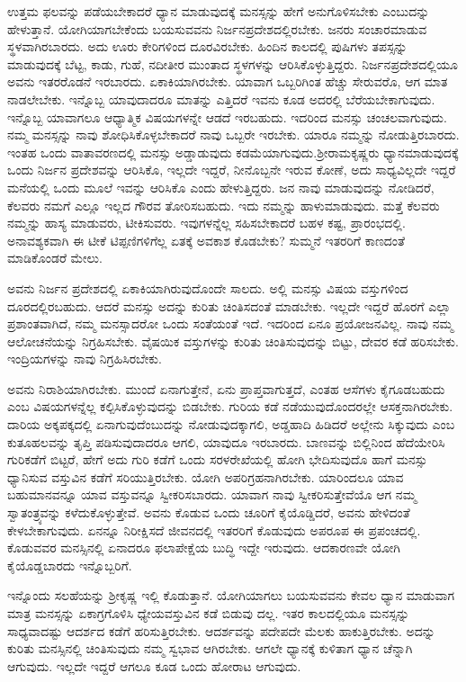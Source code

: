 ಉತ್ತಮ ಫಲವನ್ನು ಪಡೆಯಬೇಕಾದರೆ ಧ್ಯಾನ ಮಾಡುವುದಕ್ಕೆ ಮನಸ್ಸನ್ನು ಹೇಗೆ ಅನುಗೊಳಿಸಬೇಕು ಎಂಬುದನ್ನು ಹೇಳುತ್ತಾನೆ. ಯೋಗಿಯಾಗಬೇಕೆಂದು ಬಯಸುವವನು ನಿರ್ಜನಪ್ರದೇಶ\-ದಲ್ಲಿರಬೇಕು. ಜನರು ಸಂಚಾರಮಾಡುವ ಸ್ಥಳವಾಗಿರಬಾರದು. ಅದು ಊರು ಕೇರಿಗಳಿಂದ ದೂರವಿರಬೇಕು. ಹಿಂದಿನ ಕಾಲದಲ್ಲಿ ಪುಷಿಗಳು ತಪಸ್ಸನ್ನು ಮಾಡುವುದಕ್ಕೆ ಬೆಟ್ಟ, ಕಾಡು, ಗುಹೆ, ನದೀತೀರ ಮುಂತಾದ ಸ್ಥಳಗಳನ್ನು ಆರಿಸಿಕೊಳ್ಳುತ್ತಿದ್ದರು. ನಿರ್ಜನಪ್ರದೇಶದಲ್ಲಿಯೂ ಅವನು ಇತರರೊಡನೆ ಇರಬಾರದು. ಏಕಾಕಿಯಾಗಿರಬೇಕು. ಯಾವಾಗ ಒಬ್ಬರಿಗಿಂತ ಹೆಚ್ಚು ಸೇರುವರೊ, ಆಗ ಮಾತ ನಾಡಲೇಬೇಕು. ಇನ್ನೊಬ್ಬ ಯಾವುದಾದರೂ ಮಾತನ್ನು ಎತ್ತಿದರೆ ಇವನು ಕೂಡ ಅದರಲ್ಲಿ ಬೆರೆಯಬೇಕಾಗುವುದು. ಇನ್ನೊಬ್ಬ ಯಾವಾಗಲೂ ಆಧ್ಯಾತ್ಮಿಕ ವಿಷಯಗಳನ್ನೇ ಆಡದೆ ಇರಬಹುದು. ಇದರಿಂದ ಮನಸ್ಸು ಚಂಚಲವಾಗುವುದು. ನಮ್ಮ ಮನಸ್ಸನ್ನು ನಾವು ಶೋಧಿಸಿಕೊಳ್ಳಬೇಕಾದರೆ ನಾವು ಒಬ್ಬರೇ ಇರಬೇಕು. ಯಾರೂ ನಮ್ಮನ್ನು ನೋಡುತ್ತಿರಬಾರದು. ಇಂತಹ ಒಂದು ವಾತಾವರಣದಲ್ಲಿ ಮನಸ್ಸು ಅಡ್ಡಾಡುವುದು ಕಡಮೆಯಾಗುವುದು.\break ಶ‍್ರೀರಾಮಕೃಷ್ಣರು ಧ್ಯಾನಮಾಡುವುದಕ್ಕೆ ಒಂದು ನಿರ್ಜನ ಪ್ರದೇಶವನ್ನು ಆರಿಸಿಕೊ, ಇಲ್ಲದೇ ಇದ್ದರೆ, ನೀನೊಬ್ಬನೇ ಇರುವ ಕೋಣೆ, ಅದು ಸಾಧ್ಯವಿಲ್ಲದೇ ಇದ್ದರೆ ಮನೆಯಲ್ಲಿ ಒಂದು ಮೂಲೆ ಇವನ್ನು ಆರಿಸಿಕೊ ಎಂದು ಹೇಳುತ್ತಿದ್ದರು. ಜನ ನಾವು ಮಾಡುವುದನ್ನು ನೋಡಿದರೆ, ಕೆಲವರು ನಮಗೆ ಎಲ್ಲೂ ಇಲ್ಲದ ಗೌರವ ತೋರಿಸಬಹುದು. ಇದು ನಮ್ಮನ್ನು ಹಾಳುಮಾಡುವುದು. ಮತ್ತೆ ಕೆಲವರು ನಮ್ಮನ್ನು ಹಾಸ್ಯ ಮಾಡುವರು, ಟೀಕಿಸುವರು. ಇವುಗಳನ್ನೆಲ್ಲ ಸಹಿಸಬೇಕಾದರೆ ಬಹಳ ಕಷ್ಟ, ಪ್ರಾರಂಭದಲ್ಲಿ. ಅನಾವಶ್ಯಕವಾಗಿ ಈ ಟೀಕೆ ಟಿಪ್ಪಣಿಗಳಿಗೆಲ್ಲ ಏತಕ್ಕೆ ಅವಕಾಶ ಕೊಡಬೇಕು? ಸುಮ್ಮನೆ ಇತರರಿಗೆ ಕಾಣದಂತೆ ಮಾಡಿಕೊಂಡರೆ ಮೇಲು.

ಅವನು ನಿರ್ಜನ ಪ್ರದೇಶದಲ್ಲಿ ಏಕಾಕಿಯಾಗಿರುವುದೊಂದೇ ಸಾಲದು. ಅಲ್ಲಿ ಮನಸ್ಸು ವಿಷಯ ವಸ್ತುಗಳಿಂದ ದೂರದಲ್ಲಿರಬಹುದು. ಆದರೆ ಮನಸ್ಸು ಅದನ್ನು ಕುರಿತು ಚಿಂತಿಸದಂತೆ ಮಾಡಬೇಕು. ಇಲ್ಲದೇ ಇದ್ದರೆ ಹೊರಗೆ ಎಲ್ಲಾ ಪ್ರಶಾಂತವಾಗಿದೆ, ನಮ್ಮ ಮನಸ್ಸಾದರೋ ಒಂದು ಸಂತೆಯಂತೆ ಇದೆ. ಇದರಿಂದ ಏನೂ ಪ್ರಯೋಜನವಿಲ್ಲ. ನಾವು ನಮ್ಮ ಆಲೋಚನೆಯನ್ನು ನಿಗ್ರಹಿಸಬೇಕು. ವೈಷಯಿಕ ವಸ್ತುಗಳನ್ನು ಕುರಿತು ಚಿಂತಿಸುವುದನ್ನು ಬಿಟ್ಟು, ದೇವರ ಕಡೆ ಹರಿಸಬೇಕು. ಇಂದ್ರಿಯಗಳನ್ನು ನಾವು ನಿಗ್ರಹಿಸಿರಬೇಕು.

ಅವನು ನಿರಾಶಿಯಾಗಿರಬೇಕು. ಮುಂದೆ ಏನಾಗುತ್ತೇನೆ, ಏನು ಪ್ರಾಪ್ತವಾಗುತ್ತದೆ, ಎಂತಹ ಆಸೆಗಳು ಕೈಗೂಡಬಹುದು ಎಂಬ ವಿಷಯಗಳನ್ನೆಲ್ಲ ಕಲ್ಪಿಸಿಕೊಳ್ಳುವುದನ್ನು ಬಿಡಬೇಕು. ಗುರಿಯ ಕಡೆ ನಡೆಯುವುದೊಂದರಲ್ಲೇ ಆಸಕ್ತನಾಗಿರಬೇಕು. ದಾರಿಯ ಅಕ್ಕಪಕ್ಕದಲ್ಲಿ ಏನಾಗುವುದೆಂಬು\-ದನ್ನು ನೋಡುವುದಕ್ಕಾಗಲಿ, ಅಡ್ಡಹಾದಿ ಹಿಡಿದರೆ ಅಲ್ಲೇನು ಸಿಕ್ಕುವುದು ಎಂಬ ಕುತೂಹಲವನ್ನು ತೃಪ್ತಿ ಪಡಿಸುವುದಾದರೂ ಆಗಲಿ, ಯಾವುದೂ ಇರಬಾರದು. ಬಾಣವನ್ನು ಬಿಲ್ಲಿನಿಂದ ಹೆದೆಯೇರಿಸಿ ಗುರಿಕಡೆಗೆ ಬಿಟ್ಟರೆ, ಹೇಗೆ ಅದು ಗುರಿ ಕಡೆಗೆ ಒಂದು ಸರಳರೇಖೆಯಲ್ಲಿ ಹೋಗಿ ಭೇದಿಸುವುದೊ ಹಾಗೆ ಮನಸ್ಸು ಧ್ಯಾನಿಸುವ ವಸ್ತುವಿನ ಕಡೆಗೆ ಸರಿಯುತ್ತಿರಬೇಕು. ಯೋಗಿ ಅಪರಿಗ್ರಹನಾಗಿರಬೇಕು. ಯಾರಿಂದಲೂ ಯಾವ ಬಹುಮಾನವನ್ನೂ ಯಾವ ವಸ್ತುವನ್ನೂ ಸ್ವೀಕರಿಸಬಾರದು. ಯಾವಾಗ ನಾವು ಸ್ವೀಕರಿಸುತ್ತೇವೆಯೊ ಆಗ ನಮ್ಮ ಸ್ವಾತಂತ್ರ್ಯವನ್ನು ಕಳೆದುಕೊಳ್ಳುತ್ತೇವೆ. ಅವನು ಕೊಡುವ ಒಂದು ಚೂರಿಗೆ ಕೈಯೊಡ್ಡಿದರೆ, ಅವನು ಹೇಳಿದಂತೆ ಕೇಳಬೇಕಾಗುವುದು. ಏನನ್ನೂ ನಿರೀಕ್ಷಿಸದೆ ಜೀವನದಲ್ಲಿ ಇತರರಿಗೆ ಕೊಡುವುದು ಅಪರೂಪ ಈ ಪ್ರಪಂಚದಲ್ಲಿ. ಕೊಡುವವರ ಮನಸ್ಸಿನಲ್ಲಿ ಏನಾದರೂ ಫಲಾಪೇಕ್ಷೆಯ ಬುದ್ಧಿ ಇದ್ದೇ ಇರುವುದು. ಆದಕಾರಣವೇ ಯೋಗಿ ಕೈಯೊಡ್ಡಬಾರದು ಇನ್ನೊಬ್ಬರಿಗೆ.

ಇನ್ನೊಂದು ಸಲಹೆಯನ್ನು ಶ‍್ರೀಕೃಷ್ಣ ಇಲ್ಲಿ ಕೊಡುತ್ತಾನೆ. ಯೋಗಿಯಾಗಲು ಬಯಸುವವನು ಕೇವಲ ಧ್ಯಾನ ಮಾಡುವಾಗ ಮಾತ್ರ ಮನಸ್ಸನ್ನು ಏಕಾಗ್ರಗೊಳಿಸಿ ಧ್ಯೇಯವಸ್ತುವಿನ ಕಡೆ ಬಿಡುವು ದಲ್ಲ. ಇತರ ಕಾಲದಲ್ಲಿಯೂ ಮನಸ್ಸನ್ನು ಸಾಧ್ಯವಾದಷ್ಟು ಆದರ್ಶದ ಕಡೆಗೆ ಹರಿಸುತ್ತಿರಬೇಕು. ಆದರ್ಶವನ್ನು ಪದೇಪದೇ ಮೆಲಕು ಹಾಕುತ್ತಿರಬೇಕು. ಅದನ್ನು ಕುರಿತು ಮನಸ್ಸಿನಲ್ಲಿ ಚಿಂತಿಸುವುದು ನಮ್ಮ ಸ್ವಭಾವ ಆಗಿರಬೇಕು. ಆಗಲೇ ಧ್ಯಾನಕ್ಕೆ ಕುಳಿತಾಗ ಧ್ಯಾನ ಚೆನ್ನಾಗಿ ಆಗುವುದು. ಇಲ್ಲದೇ ಇದ್ದರೆ ಆಗಲೂ ಕೂಡ ಒಂದು ಹೋರಾಟ ಆಗುವುದು.

